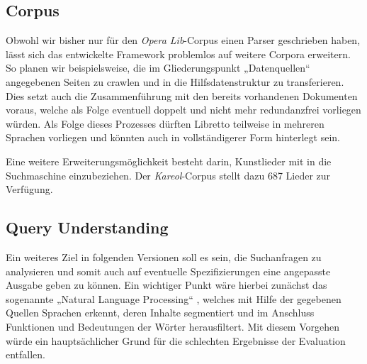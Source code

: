 \subsection{Corpus}
Obwohl wir bisher nur für den \emph{Opera Lib}-Corpus
einen Parser geschrieben haben,
lässt sich das entwickelte Framework problemlos auf weitere Corpora erweitern.
So planen wir beispielsweise,
die im Gliederungspunkt „Datenquellen“ angegebenen Seiten zu crawlen
und in die Hilfsdatenstruktur zu transferieren.
Dies setzt auch die Zusammenführung
mit den bereits vorhandenen Dokumenten voraus,
welche als Folge eventuell doppelt
und nicht mehr redundanzfrei vorliegen würden.
Als Folge dieses Prozesses dürften Libretto teilweise
in mehreren Sprachen vorliegen
und könnten auch in vollständigerer Form hinterlegt sein.

Eine weitere Erweiterungsmöglichkeit besteht darin,
Kunstlieder mit in die Suchmaschine einzubeziehen.
Der \emph{Kareol}-Corpus stellt dazu 687 Lieder zur Verfügung.

\subsection{Query Understanding}
Ein weiteres Ziel in folgenden Versionen soll es sein,
die Suchanfragen zu analysieren
und somit auch auf eventuelle Spezifizierungen
eine angepasste Ausgabe geben zu können.
Ein wichtiger Punkt wäre hierbei zunächst
das sogenannte „Natural Language Processing“ \cite{liddy2001natural},
welches mit Hilfe der gegebenen Quellen Sprachen erkennt,
deren Inhalte segmentiert und im Anschluss Funktionen
und Bedeutungen der Wörter herausfiltert.
Mit diesem Vorgehen würde ein hauptsächlicher Grund
für die schlechten Ergebnisse der Evaluation entfallen.
